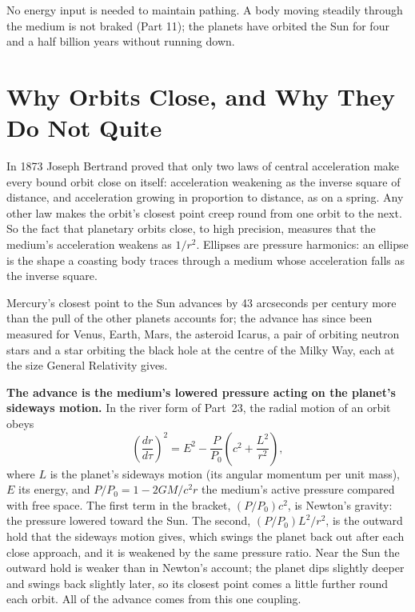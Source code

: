 \documentclass[11pt,a4paper]{article}
\begin{document}
 No energy input is needed to maintain pathing. A body moving steadily through the medium is not braked (Part 11); the planets have orbited the Sun for four and a half billion years without running down.

\section{Why Orbits Close, and Why They Do Not Quite}
\label{sec:close}

 In 1873 Joseph Bertrand proved that only two laws of central acceleration make every bound orbit close on itself: acceleration weakening as the inverse square of distance, and acceleration growing in proportion to distance, as on a spring. Any other law makes the orbit's closest point creep round from one orbit to the next. So the fact that planetary orbits close, to high precision, measures that the medium's acceleration weakens as $1/r^2$. Ellipses are pressure harmonics: an ellipse is the shape a coasting body traces through a medium whose acceleration falls as the inverse square.

 Mercury's closest point to the Sun advances by 43 arcseconds per century more than the pull of the other planets accounts for; the advance has since been measured for Venus, Earth, Mars, the asteroid Icarus, a pair of orbiting neutron stars and a star orbiting the black hole at the centre of the Milky Way, each at the size General Relativity gives.

\begin{hypbar}
\textbf{The advance is the medium's lowered pressure acting on the planet's sideways motion.} In the river form of Part~23, the radial motion of an orbit obeys
\begin{equation}
\left(\frac{dr}{d\tau}\right)^{2} = E^{2} - \frac{P}{P_0}\left(c^2 + \frac{L^2}{r^2}\right),
\label{eq:radial}
\end{equation}
where $L$ is the planet's sideways motion (its angular momentum per unit mass), $E$ its energy, and $P/P_0 = 1 - 2GM/c^2r$ the medium's active pressure compared with free space. The first term in the bracket, $(P/P_0)c^2$, is Newton's gravity: the pressure lowered toward the Sun. The second, $(P/P_0)L^2/r^2$, is the outward hold that the sideways motion gives, which swings the planet back out after each close approach, and it is weakened by the same pressure ratio. Near the Sun the outward hold is weaker than in Newton's account; the planet dips slightly deeper and swings back slightly later, so its closest point comes a little further round each orbit. All of the advance comes from this one coupling.
\end{hypbar}
\end{document}
